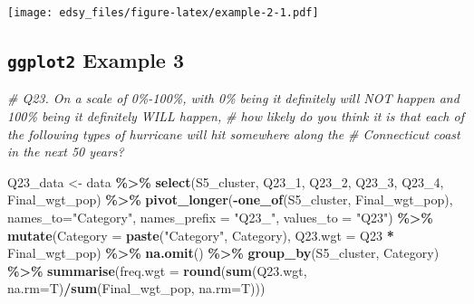 \documentclass[
]{book}
\newenvironment{Shaded}{\begin{snugshade}}{\end{snugshade}}
\newcommand{\CommentTok}[1]{\textcolor[rgb]{0.56,0.35,0.01}{\textit{#1}}}
\newcommand{\DataTypeTok}[1]{\textcolor[rgb]{0.13,0.29,0.53}{#1}}
\newcommand{\DecValTok}[1]{\textcolor[rgb]{0.00,0.00,0.81}{#1}}
\newcommand{\KeywordTok}[1]{\textcolor[rgb]{0.13,0.29,0.53}{\textbf{#1}}}
\newcommand{\NormalTok}[1]{#1}
\newcommand{\OperatorTok}[1]{\textcolor[rgb]{0.81,0.36,0.00}{\textbf{#1}}}
\newcommand{\StringTok}[1]{\textcolor[rgb]{0.31,0.60,0.02}{#1}}
\begin{document}
\texttt{[image: edsy\_files/figure-latex/example-2-1.pdf]}

\hypertarget{ggplot2-example-3}{%
\subsection{\texorpdfstring{\texttt{ggplot2} Example 3}{ggplot2 Example 3}}\label{ggplot2-example-3}}

\begin{Shaded}
\begin{Highlighting}[]
\CommentTok{\# Q23. On a scale of 0\%{-}100\%, with 0\% being it definitely will NOT happen and 100\% being it definitely WILL happen, }
\CommentTok{\# how likely do you think it is that each of the following types of hurricane will hit somewhere along the }
\CommentTok{\# Connecticut coast in the next 50 years?}

\NormalTok{Q23\_data \textless{}{-}}\StringTok{ }\NormalTok{data }\OperatorTok{\%\textgreater{}\%}
\StringTok{  }\KeywordTok{select}\NormalTok{(S5\_cluster, Q23\_}\DecValTok{1}\NormalTok{, Q23\_}\DecValTok{2}\NormalTok{, Q23\_}\DecValTok{3}\NormalTok{, Q23\_}\DecValTok{4}\NormalTok{, Final\_wgt\_pop) }\OperatorTok{\%\textgreater{}\%}
\StringTok{  }\KeywordTok{pivot\_longer}\NormalTok{(}\OperatorTok{{-}}\KeywordTok{one\_of}\NormalTok{(}\StringTok{\textquotesingle{}S5\_cluster\textquotesingle{}}\NormalTok{, }\StringTok{\textquotesingle{}Final\_wgt\_pop\textquotesingle{}}\NormalTok{), }\DataTypeTok{names\_to=}\StringTok{"Category"}\NormalTok{, }\DataTypeTok{names\_prefix =} \StringTok{"Q23\_"}\NormalTok{, }\DataTypeTok{values\_to =} \StringTok{"Q23"}\NormalTok{) }\OperatorTok{\%\textgreater{}\%}
\StringTok{  }\KeywordTok{mutate}\NormalTok{(}\DataTypeTok{Category =} \KeywordTok{paste}\NormalTok{(}\StringTok{"Category"}\NormalTok{, Category), }\DataTypeTok{Q23.wgt =}\NormalTok{ Q23 }\OperatorTok{*}\StringTok{ }\NormalTok{Final\_wgt\_pop) }\OperatorTok{\%\textgreater{}\%}
\StringTok{  }\KeywordTok{na.omit}\NormalTok{() }\OperatorTok{\%\textgreater{}\%}
\StringTok{  }\KeywordTok{group\_by}\NormalTok{(S5\_cluster, Category) }\OperatorTok{\%\textgreater{}\%}
\StringTok{  }\KeywordTok{summarise}\NormalTok{(}\DataTypeTok{freq.wgt =} \KeywordTok{round}\NormalTok{(}\KeywordTok{sum}\NormalTok{(Q23.wgt, }\DataTypeTok{na.rm=}\NormalTok{T)}\OperatorTok{/}\KeywordTok{sum}\NormalTok{(Final\_wgt\_pop, }\DataTypeTok{na.rm=}\NormalTok{T)))}


\end{Highlighting}
\end{Shaded}
\end{document}
